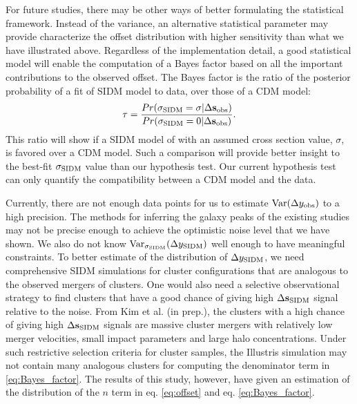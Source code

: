 For future studies, there may be other ways of better formulating the
statistical framework.
Instead of the variance, an alternative statistical parameter 
may provide characterize the offset distribution with 
higher sensitivity than what we have illustrated above.
Regardless of the implementation detail,
a good statistical model will enable the computation of a Bayes factor based
on all the important contributions to the observed offset.
The Bayes factor is the ratio of the posterior probability of a fit of SIDM model to data,
over those of a CDM model:
\begin{equation}
	\tau = \frac{Pr(\sigma_{{\rm SIDM}} = \sigma | \Delta {\bf s}_{\rm
	obs})}{Pr(\sigma_{{\rm SIDM}} = 0 | \Delta {\bf s}_{\rm obs})}.
	\label{eq:Bayes_factor}
\end{equation}
This ratio will show if a SIDM model of with an assumed cross section value, $\sigma$,
is favored over a CDM model. Such a comparison will provide better
insight to the best-fit $\sigma_{\rm SIDM}$ value than our hypothesis test.
Our current hypothesis test can only quantify the compatibility between a CDM
model and the data. 

Currently, there are not enough data points for us to estimate 
$\mathrm{Var}(\Delta y_{\rm obs})$ to a high precision. The methods for inferring 
the galaxy peaks of the existing studies may not be precise enough to 
achieve the optimistic noise level that we have shown. 
We also do not know $\mathrm{Var}_{\sigma_{\rm SIDM}}(\Delta y_{\rm SIDM})$ well enough
to have meaningful constraints. 
To better estimate of the distribution 
of $\Delta y_{\rm SIDM}$, we need comprehensive SIDM simulations 
for cluster configurations that are
analogous to the observed mergers of clusters. 
One would also need a selective observational strategy
to find clusters that have a good chance of giving high $\Delta {\bf s}_{\rm SIDM}$ signal
relative to the noise.  
From Kim et al. (in prep.), the clusters with a high chance of giving high
$\Delta {\bf s}_{\rm SIDM}$ signals are massive cluster mergers with relatively low merger
velocities, small impact parameters and large halo concentrations.
Under such restrictive selection criteria for cluster samples, 
the Illustris simulation may not contain 
many analogous clusters for computing the denominator term in
\ref{eq:Bayes_factor}.
The results of this study, however,
have given an estimation of the distribution of the $n$ term in
eq. \ref{eq:offset} and eq. \ref{eq:Bayes_factor}.  

